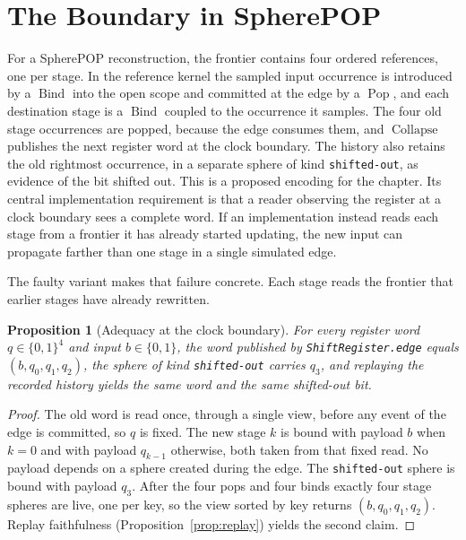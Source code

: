 \documentclass[11pt,oneside]{report}
\newcommand{\SP}{SpherePOP}
\newcommand{\Pop}{\operatorname{Pop}}
\newcommand{\Bind}{\operatorname{Bind}}
\newcommand{\Collapse}{\operatorname{Collapse}}
\theoremstyle{plain}
\newtheorem{proposition}{Proposition}[chapter]
\theoremstyle{definition}
\theoremstyle{remark}
\newcommand{\code}[2][Python]{}
\begin{document}
\section{The Boundary in \SP{}}

For a \SP{} reconstruction, the frontier contains four ordered references, one per stage. In the reference kernel the sampled input occurrence is introduced by a $\Bind$ into the open scope and committed at the edge by a $\Pop$, and each destination stage is a $\Bind$ coupled to the occurrence it samples. The four old stage occurrences are popped, because the edge consumes them, and $\Collapse$ publishes the next register word at the clock boundary. The history also retains the old rightmost occurrence, in a separate sphere of kind \texttt{shifted-out}, as evidence of the bit shifted out. This is a proposed encoding for the chapter. Its central implementation requirement is that a reader observing the register at a clock boundary sees a complete word. If an implementation instead reads each stage from a frontier it has already started updating, the new input can propagate farther than one stage in a single simulated edge.

\code{ex_regs_edge}

The faulty variant makes that failure concrete. Each stage reads the frontier that earlier stages have already rewritten.

\code{ex_regs_ripple}

\begin{proposition}[Adequacy at the clock boundary]\label{prop:clock}
For every register word $q\in\{0,1\}^4$ and input $b\in\{0,1\}$, the word published by \texttt{ShiftRegister.edge} equals $(b,q_0,q_1,q_2)$, the sphere of kind \texttt{shifted-out} carries $q_3$, and replaying the recorded history yields the same word and the same shifted-out bit.
\end{proposition}

\begin{proof}
The old word is read once, through a single view, before any event of the edge is committed, so $q$ is fixed. The new stage $k$ is bound with payload $b$ when $k=0$ and with payload $q_{k-1}$ otherwise, both taken from that fixed read. No payload depends on a sphere created during the edge. The \texttt{shifted-out} sphere is bound with payload $q_3$. After the four pops and four binds exactly four stage spheres are live, one per key, so the view sorted by key returns $(b,q_0,q_1,q_2)$. Replay faithfulness (Proposition~\ref{prop:replay}) yields the second claim.
\end{proof}
\end{document}

